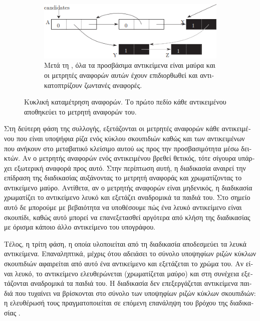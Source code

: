 \begin{greek}
\begin{figure}
  \begin{subfigure}[b]{1.0\textwidth}
    \includegraphics{figures/refcnt_2c}
    \caption
      {Μετά τη , όλα τα προσβάσιμα αντικείμενα
       είναι μαύρα και οι μετρητές αναφορών αυτών έχουν
       επιδιορθωθεί και αντικατοπτρίζουν ζωντανές αναφορές.}
  \end{subfigure}
  \caption[Κυκλική καταμέτρηση αναφορών]
    {Κυκλική καταμέτρηση αναφορών. Το πρώτο πεδίο κάθε
     αντικειμένου αποθηκεύει το μετρητή αναφορών του.}
  \label{fig:refcnt_2}
\end{figure}

Στη δεύτερη φάση της συλλογής, εξετάζονται οι μετρητές
αναφορών κάθε αντικειμένου που είναι υποψήφια ρίζα ενός
κύκλου σκουπιδιών καθώς και των αντικειμένων που ανήκουν
στο μεταβατικό κλείσιμο αυτού ως προς την προσβασιμότητα
μέσω δεικτών. Αν ο μετρητής αναφορών ενός αντικειμένου
βρεθεί θετικός, τότε σίγουρα υπάρχει εξωτερική αναφορά
προς αυτό. Στην περίπτωση αυτή, η διαδικασία
\textenglish{} αναιρεί την επίδραση της διαδικασίας
\textenglish{} αυξάνοντας το μετρητή αναφοράς και
χρωματίζοντας το αντικείμενο μαύρο. Αντίθετα, αν ο μετρητής
αναφορών είναι μηδενικός, η διαδικασία \textenglish{}
χρωματίζει το αντικείμενο λευκό και εξετάζει αναδρομικά τα
παιδιά του. Στο σημείο αυτό δε μπορούμε με βεβαιότητα να
υποθέσουμε πώς ένα λευκό αντικείμενο είναι σκουπίδι, καθώς
αυτό μπορεί να επανεξετασθεί αργότερα από κλήση της
διαδικασίας \textenglish{} με όρισμα κάποιο άλλο
αντικείμενο του υπογράφου.

Τέλος, η τρίτη φάση, η οποία υλοποιείται από τη διαδικασία
\textenglish{} αποδεσμεύει τα λευκά αντικείμενα.
Επαναληπτικά, μέχρις ότου αδειάσει το σύνολο υποψηφίων ριζών
κύκλων σκουπιδιών αφαιρείται από αυτό ένα αντικείμενο και
εξετάζεται το χρώμα του. Αν είναι λευκό, το αντικείμενο
ελευθερώνεται (χρωματίζεται μαύρο) και στη συνέχεια
εξετάζονται αναδρομικά τα παιδιά του. Η διαδικασία
\textenglish{} δεν επεξεργάζεται αντικείμενα
παιδιά που τυχαίνει να βρίσκονται στο σύνολο των υποψηφίων
ριζών κύκλων σκουπιδιών: η ελευθέρωσή τους πραγματοποιείται
σε επόμενη επανάληψη του βρόχου της διαδικασίας
\textenglish{}.


\end{greek}
